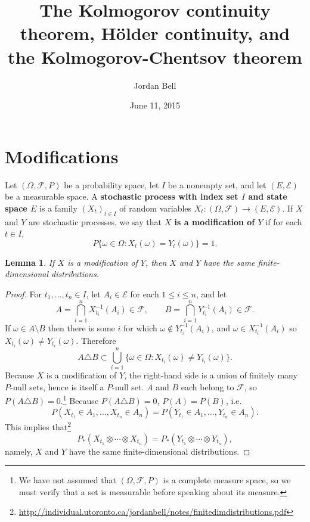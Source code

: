 \documentclass{article}
\newtheorem{lemma}[theorem]{Lemma}
\theoremstyle{definition}
\begin{document}
\title{The Kolmogorov continuity theorem, H\"older continuity, and the Kolmogorov-Chentsov theorem}
\author{Jordan Bell}
\date{June 11, 2015}

\maketitle

\section{Modifications}
Let $(\Omega,\mathscr{F},P)$ be a probability space, let $I$ be a nonempty set, and let
$(E,\mathscr{E})$ be a measurable space. A \textbf{stochastic process with index set $I$ and state space $E$} is a family 
$(X_t)_{t \in I}$ of random variables $X_t:(\Omega,\mathscr{F}) \to (E,\mathscr{E})$.
If $X$ and $Y$ are stochastic processes, we say that \textbf{$X$ is a modification of $Y$} if 
for each $t \in I$, 
\[
P\{\omega \in \Omega: X_t(\omega)=Y_t(\omega)\}=1.
\]

\begin{lemma}
If $X$ is a modification of $Y$, then $X$ and $Y$ have the same finite-dimensional distributions.
\end{lemma}
\begin{proof}
For $t_1,\ldots,t_n \in  I$, let $A_i \in \mathscr{E}$ for each $1 \leq i \leq n$, and let
\[
A = \bigcap_{i=1}^n X_{t_i}^{-1}(A_i) \in \mathscr{F}, \qquad B = \bigcap_{i=1}^n Y_{t_i}^{-1}(A_i) \in \mathscr{F}.
\]
If $\omega \in A \setminus B$ then there is some $i$ for which $\omega \not \in Y_{t_i}^{-1}(A_i)$, and
$\omega \in X_{t_i}^{-1}(A_i)$ so $X_{t_i}(\omega) \neq Y_{t_i}(\omega)$. Therefore
\[
A \triangle B \subset \bigcup_{i=1}^n \{\omega \in \Omega: X_{t_i}(\omega) \neq Y_{t_i}(\omega)\}.
\]
Because $X$ is a modification of $Y$, the right-hand side is a union of finitely many $P$-null sets,
hence is itself a $P$-null set.  $A$ and $B$ each belong to $\mathscr{F}$, so
$P(A \triangle B)=0$.\footnote{We have not assumed that $(\Omega,\mathscr{F},P)$ is a complete measure space, so we must verify
that a set is measurable before speaking about its measure.}
Because $P(A \triangle B)=0$, $P(A)=P(B)$, i.e.
\[
P(X_{t_1} \in A_1, \ldots, X_{t_n} \in A_n) = P(Y_{t_1} \in A_1, \ldots, Y_{t_n} \in A_n).
\]
This implies that\footnote{\url{http://individual.utoronto.ca/jordanbell/notes/finitedimdistributions.pdf}}
\[
P_*(X_{t_1} \otimes \cdots \otimes X_{t_n}) = P_*(Y_{t_1} \otimes \cdots \otimes Y_{t_n}),
\]
namely,  $X$ and $Y$ have the same finite-dimensional distributions.
\end{proof}
\end{document}
